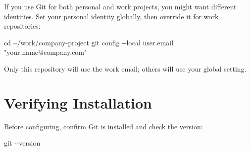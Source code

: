 \documentclass[
  letterpaper,
  DIV=11,
  numbers=noendperiod]{scrreprt}
\newenvironment{Shaded}{\begin{snugshade}}{\end{snugshade}}
\newcommand{\AttributeTok}[1]{\textcolor[rgb]{0.40,0.45,0.13}{#1}}
\newcommand{\BuiltInTok}[1]{\textcolor[rgb]{0.00,0.23,0.31}{#1}}
\newcommand{\FunctionTok}[1]{\textcolor[rgb]{0.28,0.35,0.67}{#1}}
\newcommand{\NormalTok}[1]{\textcolor[rgb]{0.00,0.23,0.31}{#1}}
\newcommand{\StringTok}[1]{\textcolor[rgb]{0.13,0.47,0.30}{#1}}
\begin{document}
\begin{tcolorbox}[enhanced jigsaw, opacitybacktitle=0.6, arc=.35mm, colback=white, bottomtitle=1mm, opacityback=0, toprule=.15mm, left=2mm, colbacktitle=quarto-callout-tip-color!10!white, breakable, coltitle=black, toptitle=1mm, colframe=quarto-callout-tip-color-frame, bottomrule=.15mm, titlerule=0mm, title=\textcolor{quarto-callout-tip-color}{\faLightbulb}\hspace{0.5em}{Using Different Identities}, rightrule=.15mm, leftrule=.75mm]

If you use Git for both personal and work projects, you might want
different identities. Set your personal identity globally, then override
it for work repositories:

\begin{codelisting}[H]

\caption{\texttt{terminal}}

\begin{Shaded}
\begin{Highlighting}[]
\BuiltInTok{cd}\NormalTok{ \textasciitilde{}/work/company{-}project}
\FunctionTok{git}\NormalTok{ config }\AttributeTok{{-}{-}local}\NormalTok{ user.email }\StringTok{"your.name@company.com"}
\end{Highlighting}
\end{Shaded}

\end{codelisting}

Only this repository will use the work email; others will use your
global setting.

\end{tcolorbox}

\section{Verifying Installation}\label{verifying-installation}

Before configuring, confirm Git is installed and check the version:

\begin{codelisting}

\caption{\texttt{terminal}}

\begin{Shaded}
\begin{Highlighting}[]
\FunctionTok{git} \AttributeTok{{-}{-}version}
\end{Highlighting}
\end{Shaded}

\end{codelisting}
\end{document}
